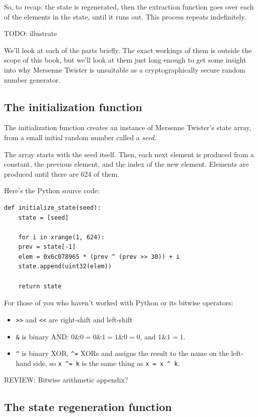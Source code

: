 \documentclass[11pt,ebook,table,dvipsnames]{memoir}
\begin{document}
So, to recap: the state is regenerated, then the extraction function
goes over each of the elements in the state, until it runs out. This
process repeats indefinitely.

TODO: illustrate

We'll look at each of the parts briefly. The exact workings of them is
outside the scope of this book, but we'll look at them just long
enough to get some insight into why Mersenne Twister is unsuitable as
a cryptographically secure random number generator.
\subsection{The initialization function}
\label{sec-2-10-6-2}

The initialization function creates an instance of Mersenne Twister's
state array, from a small initial random number called a \emph{seed}.

The array starts with the seed itself. Then, each next element is
produced from a constant, the previous element, and the index of the
new element. Elements are produced until there are 624 of them.

Here's the Python source code:

\begin{verbatim}
def initialize_state(seed):
    state = [seed]

    for i in xrange(1, 624):
	prev = state[-1]
	elem = 0x6c078965 * (prev ^ (prev >> 30)) + i
	state.append(uint32(elem))

    return state
\end{verbatim}

For those of you who haven't worked with Python or its bitwise
operators:

\begin{itemize}
\item \verb~>>~ and \verb~<<~ are right-shift and left-shift
\item \verb~&~ is binary AND: $0 \& 0 = 0 \& 1 = 1 \& 0 = 0$, and $1 \& 1 =
   1$.
\item \verb~^~ is binary XOR, \verb~^=~ XORs and assigns the result to
the name on the left-hand side, so \verb~x ^= k~ is the same
thing as \verb~x = x ^ k~.
\end{itemize}

REVIEW: Bitwise arithmetic appendix?
\subsection{The state regeneration function}
\label{sec-2-10-6-3}
\end{document}
